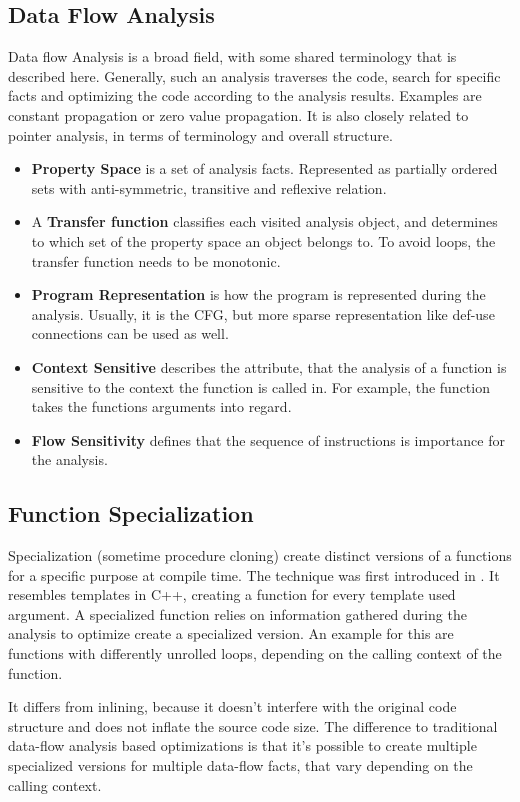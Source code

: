 \subsection{Data Flow Analysis}
Data flow Analysis is a broad field, with some shared terminology that is described here. Generally, such an analysis traverses the code,
search for specific facts and optimizing the code according to the analysis results. Examples are constant propagation or zero value propagation. It is also closely related to pointer analysis, in terms of terminology and overall structure.
\begin{itemize}
	\item \textbf{Property Space} is a set of analysis facts. Represented as partially ordered sets with anti-symmetric, transitive and reflexive relation.
	\item A \textbf{Transfer function} classifies each visited analysis object, and determines to which set of the property space an object belongs to. To avoid loops, the transfer function needs to be monotonic.
	\item \textbf{Program Representation} is how the program is represented during the analysis. Usually, it is the CFG, but more sparse representation like def-use connections can be used as well. 
	\item \textbf{Context Sensitive} describes the attribute, that the analysis of a function is sensitive to the context the function is called in. For example, the function
	takes the functions arguments into regard.
	\item \textbf{Flow Sensitivity} defines that the sequence of instructions is importance for the analysis. 
\end{itemize}

\subsection{Function Specialization}
Specialization (sometime procedure cloning) create distinct versions of a functions for a specific purpose at compile time. The technique was first introduced in \cite{prod-clone}. It resembles templates in C++, creating a function for every template used argument. A specialized function relies on information gathered during the analysis to optimize create a specialized version. An example for this are functions with differently unrolled loops, depending on the calling context of the function.

It differs from inlining, because it doesn't interfere with the original code structure and does not inflate the source code size. The difference to traditional data-flow analysis based optimizations is that it's possible to create multiple specialized versions for multiple data-flow facts, that vary depending on the calling context.   